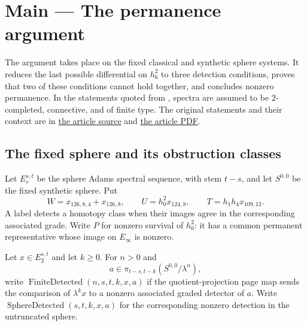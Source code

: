 \chapter{Main — The permanence argument}
The argument takes place on the fixed classical and synthetic sphere systems. It reduces the last possible differential on $h_6^2$ to three detection conditions, proves that two of these conditions cannot hold together, and concludes nonzero permanence.
In the statements quoted from \cite{LWX126}, spectra are assumed to be $2$-completed, connective, and of finite type. The original statements and their context are in \href{paper/main.tex.html}{the article source} and \href{paper/2412.10879.pdf}{the article PDF}.

\section{The fixed sphere and its obstruction classes}
Let $E_r^{s,t}$ be the sphere Adams spectral sequence, with stem $t-s$, and let $S^{0,0}$ be the fixed synthetic sphere. Put
\[
 W=x_{126,8,4}+x_{126,8},\qquad U=h_0^2x_{124,8},\qquad T=h_1h_4x_{109,12}.
\]
A label detects a homotopy class when their images agree in the corresponding associated grade. Write $P$ for nonzero survival of $h_6^2$: it has a common permanent representative whose image on $E_\infty$ is nonzero.

Let $x\in E_2^{s,t}$ and let $k\geq0$. For $n>0$ and
\[
 a\in\pi_{t-s,t-k}(S^{0,0}/\lambda^n),
\]
write $\operatorname{FiniteDetected}(n,s,t,k,x,a)$ if the quotient-projection page map sends the comparison of $\lambda^kx$ to a nonzero associated graded detector of $a$.
Write $\operatorname{SphereDetected}(s,t,k,x,a)$ for the corresponding nonzero detection in the untruncated sphere.

